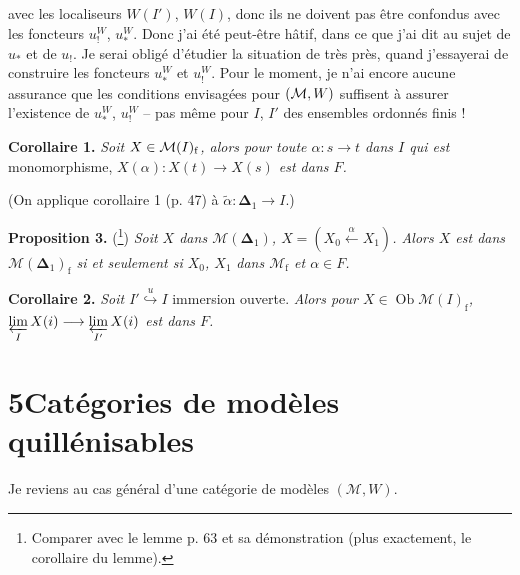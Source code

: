 \noindent{}

\noindent avec les localiseurs $W(I')$, $W(I)$, donc ils ne doivent pas être confondus avec les foncteurs $u_{!}^W$, $u_*^W$. Donc j'ai été peut-être hâtif, dans ce que j'ai dit au sujet de $u_*$ et de $u_{!}$. Je serai obligé d'étudier la situation de très près, quand j'essayerai de construire les foncteurs $u_*^W$ et $u_{!}^W$. Pour le moment, je n'ai encore aucune assurance que les conditions envisagées pour $(\mathcal{M},W)$ suffisent à assurer l'existence de $u_*^W$, $u_{!}^W$ – pas même pour $I$, $I'$ des ensembles ordonnés finis !

\textbf{Corollaire 1.} \textit{Soit $X \in \mathcal{M}(I)_{\mathrm{f}}$, alors pour toute $\alpha : s \longrightarrow t$ dans $I$ qui est} monomorphisme, \textit{$X(\alpha) : X(t) \longrightarrow X(s)$ est dans $F$.}


(On applique corollaire 1 (p. 47) à $\tilde{\alpha} : \boldsymbol{\Delta}_1 \longrightarrow I$.)

\textbf{Proposition 3.} (\footnote[28]{Comparer avec le lemme p. 63 et sa démonstration (plus exactement, le corollaire du lemme).}) \textit{Soit $X$ dans $\mathcal{M}(\boldsymbol{\Delta}_1)$, $X = (X_0 \xleftarrow{\alpha} X_1)$. Alors $X$ est dans $\mathcal{M}(\boldsymbol{\Delta}_1)_{\mathrm{f}}$ si et seulement si $X_0$, $X_1$} \textit{dans $\mathcal{M}_{\mathrm{f}}$ et $\alpha \in F$.}

\textbf{Corollaire 2.} \textit{Soit $I' \overset{u}{\hookrightarrow} I$} immersion ouverte. \textit{Alors pour $X \in \operatorname{Ob}\mathcal{M}(I)_{\mathrm{f}}$, $\varprojlim\limits_{I} X(i) \longrightarrow \varprojlim\limits_{I'} X(i)$ est dans $F$.}

\section*{5\quad Catégories de modèles quillénisables}

Je reviens au cas général d'une catégorie de modèles $(\mathcal{M},W)$.

